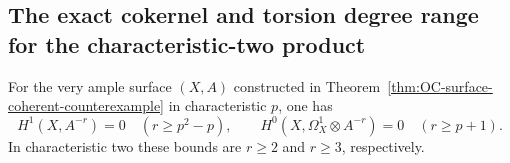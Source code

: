 \subsection{The exact cokernel and torsion degree range for the characteristic-two product}

\begin{lemma}
\label{lem:OC-surface-uniform-negative-bounds}
For the very ample surface $(X,A)$ constructed in
Theorem~\ref{thm:OC-surface-coherent-counterexample} in characteristic $p$, one has
\[
 H^1(X,A^{-r})=0\quad(r\geq p^2-p),\qquad
 H^0(X,\Omega_X^1\otimes A^{-r})=0\quad(r\geq p+1).
\]
In characteristic two these bounds are $r\geq2$ and $r\geq3$, respectively.
\end{lemma}
